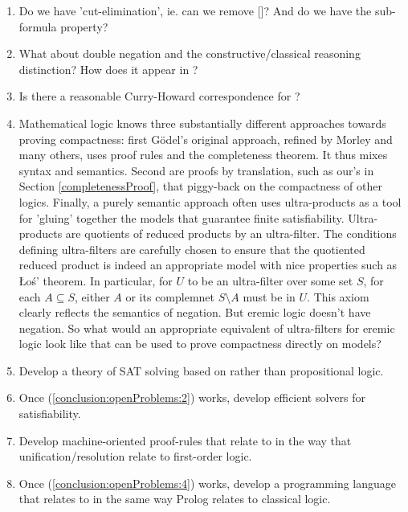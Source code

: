 \begin{enumerate}

\item Do we have 'cut-elimination', ie. can we remove
  []?  And do we have the sub-formula property?

\item What about double negation and the constructive/classical
  reasoning distinction?  How does it appear in \ELABR{}?

\item Is there a reasonable Curry-Howard correspondence for \ELFULL{}?

\item Mathematical logic knows three substantially different
  approaches towards proving compactness: first G\"odel's original
  approach, refined by Morley and many others, uses proof rules and
  the completeness theorem. It thus mixes syntax and semantics. Second
  are proofs by translation, such as our's in Section
  \ref{completenessProof}, that piggy-back on the compactness of other
  logics. Finally, a purely semantic approach often uses
  ultra-products as a tool for 'gluing' together the models that
  guarantee finite satisfiability. Ultra-products are quotients of
  reduced products by an ultra-filter. The conditions defining
  ultra-filters are carefully chosen to ensure that the quotiented
  reduced product is indeed an appropriate model with nice properties
  such as \L{}o\'{s}' theorem. In particular, for $U$ to be an
  ultra-filter over some set $S$, for each $A \subseteq S$, either $A$
  or its complemnet $S\setminus A$ must be in $U$. This axiom clearly
  reflects the semantics of negation. But eremic logic doesn't have
  negation. So what would an appropriate equivalent of ultra-filters
  for eremic logic look like that can be used to prove compactness
  directly on models?

\item\label{conclusion:openProblems:2}  Develop a theory of SAT solving based on \ELABR{} rather than
  propositional logic.

\item Once (\ref{conclusion:openProblems:2}) works, develop efficient
  solvers for \ELABR{} satisfiability.

\item\label{conclusion:openProblems:4} Develop machine-oriented proof-rules that relate to \ELABR{}
  in the way that unification/resolution relate to first-order logic.

\item Once (\ref{conclusion:openProblems:4}) works, develop a
  programming language that relates to \ELABR{} in the same way
  Prolog relates to classical logic.


\end{enumerate}
